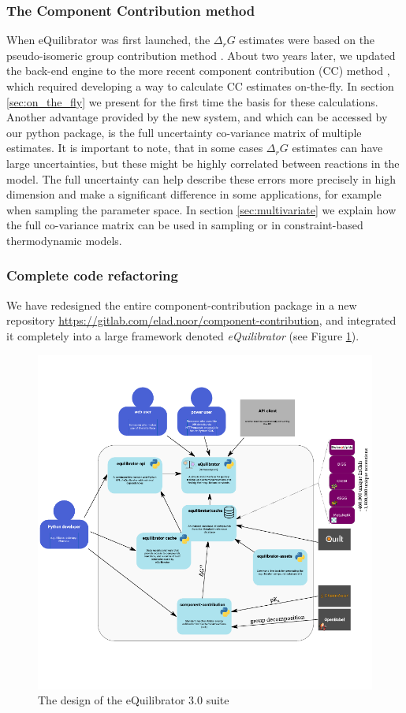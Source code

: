 \documentclass[twocolumn]{article}
\begin{document}
\subsubsection{The Component Contribution method}
When eQuilibrator was first launched, the $\Delta_r G$ estimates were based on the pseudo-isomeric group contribution method \cite{noor_integrated_2012}. About two years later, we updated the back-end engine to the more recent component contribution (CC) method \cite{noor_consistent_2013}, which required developing a way to calculate CC estimates on-the-fly. In section \ref{sec:on_the_fly} we present for the first time the basis for these calculations. Another advantage provided by the new system, and which can be accessed by our python package, is the full uncertainty co-variance matrix of multiple estimates. It is important to note, that in some cases $\Delta_r G$ estimates can have large uncertainties, but these might be highly correlated between reactions in the model. The full uncertainty can help describe these errors more precisely in high dimension and make a significant difference in some applications, for example when sampling the parameter space. In section \ref{sec:multivariate} we explain how the full co-variance matrix can be used in sampling or in constraint-based thermodynamic models.

\subsubsection{Complete code refactoring}
We have redesigned the entire component-contribution package in a new repository \url{https://gitlab.com/elad.noor/component-contribution}, and integrated it completely into a large framework denoted \textit{eQuilibrator} (see Figure \ref{fig:eq3_design}).

\begin{figure}
    \centering
    \includegraphics[width=\textwidth]{equilibrator_3_0.pdf}
    \caption{The design of the eQuilibrator 3.0 suite}
    \label{fig:eq3_design}
\end{figure}
\end{document}
